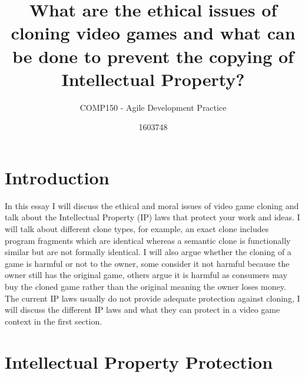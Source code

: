 \documentclass{scrartcl}
\title{What are the ethical issues of cloning video games and what can be done to prevent the copying of Intellectual Property?}
\subtitle{COMP150 - Agile Development Practice}
\author{1603748}
\begin{document}
\maketitle


\section*{Introduction}
 
In this essay I will discuss the ethical and moral issues of video game cloning and talk about the Intellectual Property (IP) laws that protect your work and ideas. I will talk about different clone types, for example, an exact clone includes program fragments which are identical whereas a semantic clone is functionally similar but are not formally identical. I will also argue whether the cloning of a game is harmful or not to the owner, some consider it not harmful because the owner still has the original game, others argue it is harmful as consumers may buy the cloned game rather than the original meaning the owner loses money. The current IP laws usually do not provide adequate protection against cloning, I will discuss the different IP laws and what they can protect in a video game context in the first section.

\section*{Intellectual Property Protection}
\end{document}

